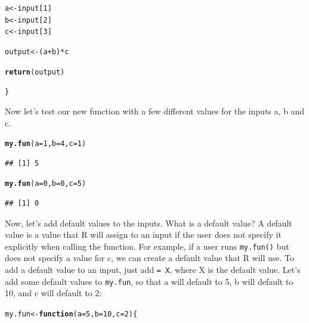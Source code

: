 \documentclass{tufte-book}\usepackage[]{graphicx}\usepackage[]{color}
\makeatletter
\newcommand{\hlnum}[1]{\textcolor[rgb]{0.686,0.059,0.569}{#1}}%
\newcommand{\hlopt}[1]{\textcolor[rgb]{0,0,0}{#1}}%
\newcommand{\hlstd}[1]{\textcolor[rgb]{0.345,0.345,0.345}{#1}}%
\newcommand{\hlkwa}[1]{\textcolor[rgb]{0.161,0.373,0.58}{\textbf{#1}}}%
\newcommand{\hlkwb}[1]{\textcolor[rgb]{0.69,0.353,0.396}{#1}}%
\newcommand{\hlkwc}[1]{\textcolor[rgb]{0.333,0.667,0.333}{#1}}%
\newcommand{\hlkwd}[1]{\textcolor[rgb]{0.737,0.353,0.396}{\textbf{#1}}}%
\newenvironment{kframe}{%
 \def\at@end@of@kframe{}%
 \ifinner\ifhmode%
  \def\at@end@of@kframe{\end{minipage}}%
  \begin{minipage}{\columnwidth}%
 \fi\fi%
 \def\FrameCommand##1{\hskip\@totalleftmargin \hskip-\fboxsep
 \colorbox{shadecolor}{##1}\hskip-\fboxsep
     \hskip-\linewidth \hskip-\@totalleftmargin \hskip\columnwidth}%
 \MakeFramed {\advance\hsize-\width
   \@totalleftmargin\z@ \linewidth\hsize
   \@setminipage}}%
 {\par\unskip\endMakeFramed%
 \at@end@of@kframe}
\newenvironment{knitrout}{}{} %
\makeatother
\begin{document}
\begin{footnotesize}
\begin{marginfigure}
\begin{tiny}
\begin{knitrout}
\begin{kframe}
\begin{alltt}
  \hlstd{a} \hlkwb{<-} \hlstd{input[}\hlnum{1}\hlstd{]}
  \hlstd{b} \hlkwb{<-} \hlstd{input[}\hlnum{2}\hlstd{]}
  \hlstd{c} \hlkwb{<-} \hlstd{input[}\hlnum{3}\hlstd{]}

  \hlstd{output} \hlkwb{<-} \hlstd{(a} \hlopt{+} \hlstd{b)} \hlopt{*} \hlstd{c}

  \hlkwd{return}\hlstd{(output)}

\hlstd{\}}
\end{alltt}
\end{kframe}
\end{knitrout}
\end{tiny}
\end{marginfigure}

Now let's test our new function with a few different values for the inputs a, b and c.

\begin{knitrout}
\color{fgcolor}\begin{kframe}
\begin{alltt}
\hlkwd{my.fun}\hlstd{(}\hlkwc{a} \hlstd{=} \hlnum{1}\hlstd{,} \hlkwc{b} \hlstd{=} \hlnum{4}\hlstd{,} \hlkwc{c} \hlstd{=} \hlnum{1}\hlstd{)}
\end{alltt}
\begin{verbatim}
## [1] 5
\end{verbatim}
\begin{alltt}
\hlkwd{my.fun}\hlstd{(}\hlkwc{a} \hlstd{=} \hlnum{0}\hlstd{,} \hlkwc{b} \hlstd{=} \hlnum{0}\hlstd{,} \hlkwc{c} \hlstd{=} \hlnum{5}\hlstd{)}
\end{alltt}
\begin{verbatim}
## [1] 0
\end{verbatim}
\end{kframe}
\end{knitrout}

Now, let's add default values to the inputs. What is a default value? A default value is a value that R will assign to an input if the user does not specify it explicitly when calling the function. For example, if a user runs \texttt{my.fun()} but does not specify a value for c, we can create a default value that R will use. To add a default value to an input, just add \texttt{= X}, where X is the default value. Let's add some default values to \texttt{my.fun}, so that a will default to 5, b will default to 10, and c will default to 2:

\begin{knitrout}
\color{fgcolor}\begin{kframe}
\begin{alltt}
\hlstd{my.fun} \hlkwb{<-} \hlkwa{function}\hlstd{(}\hlkwc{a} \hlstd{=} \hlnum{5}\hlstd{,} \hlkwc{b} \hlstd{=} \hlnum{10}\hlstd{,} \hlkwc{c} \hlstd{=} \hlnum{2}\hlstd{) \{}


\end{alltt}
\end{kframe}
\end{knitrout}
\end{footnotesize}
\end{document}
